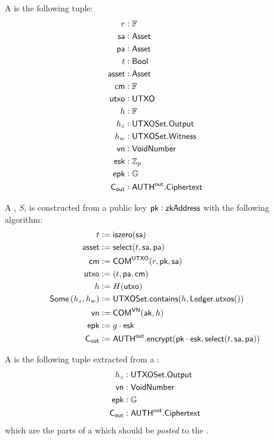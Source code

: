 \begin{definition}
    A \Sender{} is the following tuple:
    \begin{align*}
        r      &: \F \\
        \sa    &: \Asset \\
        \pa    &: \Asset \\
        t      &: \Bool \\
        \asset &: \Asset \\
        \cm    &: \F \\
        \utxo  &: \UTXO \\
        h      &: \F \\
        h_z    &: \UTXOSet.\Output \\
        h_w    &: \UTXOSet.\Witness \\
        \vn    &: \VoidNumber \\
        \esk   &: \Z_p \\
        \epk   &: \G \\
        \Cout  &: \AUTHout.\Ciphertext
    \end{align*}

    A \Sender{}, $S$, is constructed from a public key $\pk : \zkAddress$ with the following algorithm:
    \begin{align*}
        t      &:= \iszero(\sa) \\
        \asset &:= \select(t, \sa, \pa) \\
        \cm    &:= \COM^{\UTXO}(r, \pk, \sa) \\
        \utxo  &:= (t, \pa, \cm) \\
        h      &:= H(\utxo) \\
        \Some\left(h_z, h_w\right) &:= \UTXOSet.\contains(h, \Ledger.\utxos()) \\
        \vn    &:= \COM^{\VN}(\ak, h) \\
        \epk   &:= g \cdot \esk \\
        \Cout  &:= \AUTHout.\encrypt(\pk \cdot \esk, \select(t, \sa, \pa))
    \end{align*}
\end{definition}

\begin{definition}
    A \SenderPost{} is the following tuple extracted from a \Sender{}:
    \begin{align*}
        h_z   &: \UTXOSet.\Output \\
        \vn   &: \VoidNumber \\
        \epk  &: \G \\
        \Cout &: \AUTHout.\Ciphertext
    \end{align*}
    which are the parts of a \Sender{} which should be \emph{posted} to the \Ledger{}.
\end{definition}

